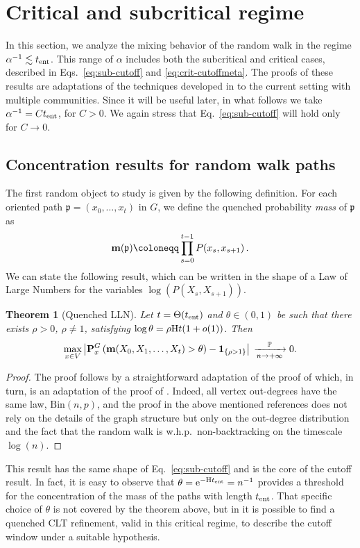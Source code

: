 \documentclass[11pt,oneside]{amsart}
\numberwithin{equation}{section}  %
\theoremstyle{plain}
\newtheorem{theorem}{Theorem}
\newcommand{\whp}{{w.h.p.~}}
\newcommand{\p}{\mathbb{P}}
\newcommand{\one}{\textup{\textbf{1}}}
\newcommand{\pconv}{\xrightarrow[n \to +\infty]{\quad \p \quad}}
\newcommand{\bin}{\text{Bin}}
\newcommand{\tent}{t_{\textup{ent}}}
\newcommand{\quenchG}{\mathbf{P}^G}
\newcommand{\entropy}{\textup{H}}
\newcommand{\mass}{\textup{\textbf{m}}}
\newcommand{\pat}{\mathfrak{p}}
\begin{document}
\section{Critical and subcritical regime}\label{sect:entropic-method}
In this section, we analyze the mixing behavior of the random walk in the regime $\alpha^{-1} \lesssim \tent$. 
This range of $\alpha$ includes both the subcritical and critical cases, described in Eqs.~\eqref{eq:sub-cutoff} 
and \eqref{eq:crit-cutoffmeta}.
The proofs of these results are adaptations of the techniques developed in \cite{BCS1,BP} to the current setting 
with multiple communities. 
%
Since it will be useful later, in what follows we take $\alpha^{-1}=C\tent$, for $C>0$. We again stress that Eq.~\eqref{eq:sub-cutoff} will hold only for $C\to 0$.
\subsection{Concentration results for random walk paths}
The first random object to study is given by the following definition. For each oriented path $\pat=(x_0,\dots,x_t)$ in $G$, we define the quenched probability \textit{mass} of $\pat$ as
$$\mass(\pat)\coloneqq\prod_{s = 0}^{t-1} P(x_s,x_{s+1})\,.$$
We can state the following result, which can be written in the shape of a Law of Large Numbers for the variables $\log(P(X_s,X_{s+1}))$. 

\begin{theorem}[Quenched LLN] \label{thm:LLN}
	Let $t=\Theta(\tent)$ and $\theta \in (0,1)$ be such that there exists $\rho>0$, $\rho\neq1$, satisfying $\log \theta = \rho \entropy t (1+o(1))$.
		Then
	\begin{equation}
		\max_{x \in V} \left|\quenchG_x\left(\mass(X_0,X_1,\dots,X_t)>\theta\right)-\one_{\{\rho>1\}} \right|\, \pconv 0.
	\end{equation}
		\end{theorem}
	\begin{proof}
		The proof follows by a straightforward adaptation of the proof of \cite[Theorem 3]{BP} which, in turn, is an adaptation of the proof of \cite[Theorem 4]{BCS2}. 
		Indeed, all vertex out-degrees have the same law, $\bin(n,p)$, and the proof in the above mentioned references does not rely on the details of the graph structure but only on the out-degree distribution and the fact that the random walk is \whp non-backtracking on the timescale $\log(n)$.
			\end{proof}
	This result has the same shape of Eq.~\eqref{eq:sub-cutoff} and is the core of the cutoff result. In fact, it is easy to observe that $\theta={\rm e}^{-\entropy \tent}=n^{-1}$ provides a threshold for the concentration of the mass of the paths with length $\tent$. That specific choice of $\theta$ is not covered by the theorem above, but in \cite{BP} it is possible to find a quenched CLT refinement, valid in this critical regime, to describe the cutoff window under a suitable hypothesis.\\
	
\end{document}
